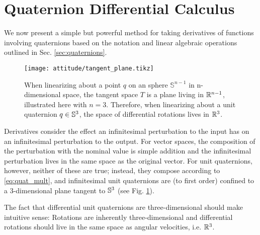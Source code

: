 \documentclass[../root.tex]{subfiles}
\begin{document}
\section{Quaternion Differential Calculus} \label{sec:Quaternion_Calculus}

    We now present a simple but powerful method for taking derivatives of functions 
    involving quaternions based on the notation and linear algebraic operations outlined 
    in Sec. \ref{sec:quaternions}.
    
    \begin{figure}
        \centering
        \texttt{[image: attitude/tangent\_plane.tikz]}
        \caption{
            When linearizing about a point $q$ on an sphere $\mathbb{S}^{n-1}$ in 
            n-dimensional space, the tangent space $T$ is a plane living in $\mathbb{R}^{n-1}$, 
            illustrated here with $n=3$. Therefore, when linearizing about a unit 
            quaternion $q \in \mathbb{S}^3$, the space of differential rotations lives in $\mathbb{R}^3$.
        }
        \label{fig:tangent_plane}
    \end{figure}
        
        Derivatives consider the effect an infinitesimal perturbation to the input has on
        an infinitesimal perturbation to the output. For vector spaces, the composition
        of the perturbation with the nominal value is simple addition and the
        infinitesimal perturbation lives in the same space as the original vector. For
        unit quaternions, however, neither of these are true; instead, they compose
        according to \eqref{eq:quat_mult}, and infinitesimal unit quaternions are (to
        first order) confined to a 3-dimensional plane tangent to $\mathbb{S}^3$ (see Fig.
        \ref{fig:tangent_plane}).

        The fact that differential unit quaternions are three-dimensional should make
        intuitive sense: Rotations are inherently three-dimensional and differential
        rotations should live in the same space as angular velocities, i.e. $\mathbb{R}^3$.
        
\end{document}
